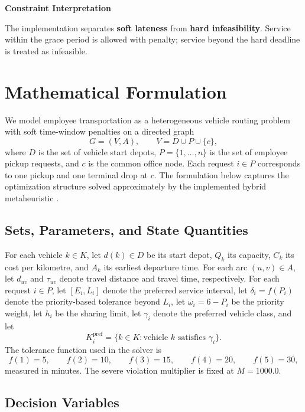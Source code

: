 \documentclass[11pt,a4paper]{article}
\newenvironment{callout}[1]{%
  \par\medskip
  \noindent\textbf{#1}\par
  \small\itshape
}{%
  \par\medskip\normalfont
}
\newenvironment{insightbox}[1][Discussion]{\begin{callout}{#1}}{\end{callout}}
\begin{document}
\begin{insightbox}[Constraint Interpretation]
\small The implementation separates \textbf{soft lateness} from \textbf{hard infeasibility}. Service within the grace period is allowed with penalty; service beyond the hard deadline is treated as infeasible.
\end{insightbox}

\section{Mathematical Formulation}

We model employee transportation as a heterogeneous vehicle routing problem with soft time-window penalties on a directed graph
\[
G=(V,A), \qquad V=D\cup P\cup \{c\},
\]
where $D$ is the set of vehicle start depots, $P=\{1,\dots,n\}$ is the set of employee pickup requests, and $c$ is the common office node. Each request $i\in P$ corresponds to one pickup and one terminal drop at $c$. The formulation below captures the optimization structure solved approximately by the implemented hybrid metaheuristic \cite{golden2008,parragh2008,cordeau2001}.

\subsection{Sets, Parameters, and State Quantities}

For each vehicle $k\in K$, let $d(k)\in D$ be its start depot, $Q_k$ its capacity, $C_k$ its cost per kilometre, and $A_k$ its earliest departure time. For each arc $(u,v)\in A$, let $d_{uv}$ and $\tau_{uv}$ denote travel distance and travel time, respectively. For each request $i\in P$, let $[E_i,L_i]$ denote the preferred service interval, let $\delta_i=f(P_i)$ denote the priority-based tolerance beyond $L_i$, let $\omega_i=6-P_i$ be the priority weight, let $h_i$ be the sharing limit, let $\gamma_i$ denote the preferred vehicle class, and let
\[
K_i^{\mathrm{pref}}=\{k\in K:\text{vehicle }k\text{ satisfies }\gamma_i\}.
\]
The tolerance function used in the solver is
\[
f(1)=5,\qquad f(2)=10,\qquad f(3)=15,\qquad f(4)=20,\qquad f(5)=30,
\]
measured in minutes. The severe violation multiplier is fixed at $M=1000.0$.

\subsection{Decision Variables}
\end{document}
